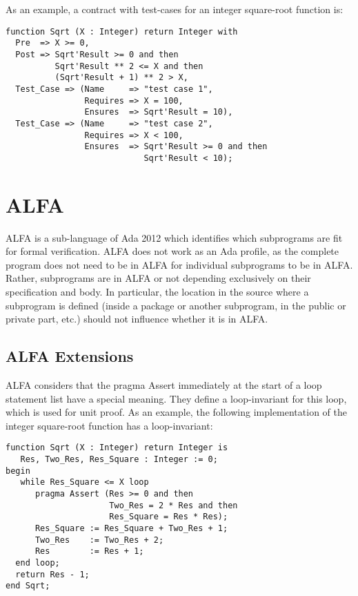 \documentclass{article}
\begin{document}
As an example, a contract with test-cases for an integer square-root function
is:

\begin{verbatim}
function Sqrt (X : Integer) return Integer with
  Pre  => X >= 0,
  Post => Sqrt'Result >= 0 and then
          Sqrt'Result ** 2 <= X and then
          (Sqrt'Result + 1) ** 2 > X,
  Test_Case => (Name     => "test case 1",
                Requires => X = 100, 
                Ensures  => Sqrt'Result = 10),
  Test_Case => (Name     => "test case 2",
                Requires => X < 100, 
                Ensures  => Sqrt'Result >= 0 and then 
                            Sqrt'Result < 10);
\end{verbatim}

\section{ALFA}

ALFA is a sub-language of Ada 2012 which identifies which subprograms are fit
for formal verification. ALFA does not work as an Ada profile, as the complete
program does not need to be in ALFA for individual subprograms to be in
ALFA. Rather, subprograms are in ALFA or not depending exclusively on their
specification and body. In particular, the location in the source where a
subprogram is defined (inside a package or another subprogram, in the public or
private part, etc.) should not influence whether it is in ALFA.

\subsection{ALFA Extensions}

ALFA considers that the pragma Assert immediately at the start of a loop
statement list have a special meaning. They define a loop-invariant for this
loop, which is used for unit proof.  As an example, the following
implementation of the integer square-root function has a loop-invariant:

\begin{verbatim}
function Sqrt (X : Integer) return Integer is
   Res, Two_Res, Res_Square : Integer := 0;
begin
   while Res_Square <= X loop
      pragma Assert (Res >= 0 and then
                     Two_Res = 2 * Res and then
                     Res_Square = Res * Res);
      Res_Square := Res_Square + Two_Res + 1;
      Two_Res    := Two_Res + 2;
      Res        := Res + 1;
  end loop;
  return Res - 1;
end Sqrt;
\end{verbatim}
\end{document}
